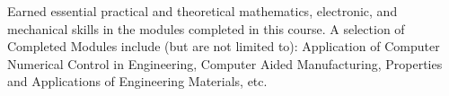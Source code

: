 \documentclass[10pt,a4paper,withhyper]{altacv}
\begin{document}
\divider

Earned essential practical and theoretical mathematics, electronic, and mechanical skills in the modules completed in this course. A selection of Completed Modules include (but are not limited to): Application of Computer Numerical Control in Engineering, Computer Aided Manufacturing, Properties and Applications of Engineering Materials, etc.

\smallskip
\end{document}

